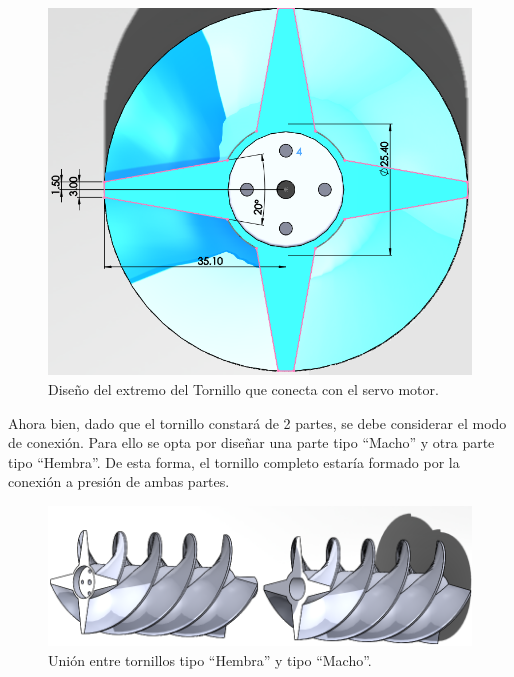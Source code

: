 \begin{figure}[H]
    \begin{center}
    	\includegraphics[scale=0.5]{img/motornillo.png}
    \end{center}
    \caption{Diseño del extremo del Tornillo que conecta con el servo motor. \label{motornillopng}}
\end{figure}
    
Ahora bien, dado que el tornillo constará de 2 partes, se debe considerar el modo de conexión. Para ello se opta por diseñar una parte tipo ``Macho'' y otra parte tipo ``Hembra''. De esta forma, el tornillo completo estaría formado por la conexión a presión de ambas partes.

\begin{figure}[H]
    \begin{center}
    	\includegraphics[scale=0.6]{img/semicircular.png}
    \end{center}
    \caption{Unión entre tornillos tipo ``Hembra'' y tipo ``Macho''. \label{semicircularpng}}
\end{figure}

